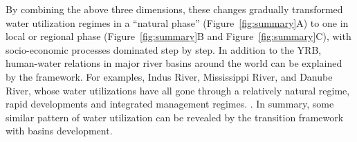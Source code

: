 \documentclass[9pt, twocolumn, twoside, lineno]{pnas-new}
\begin{document}
By combining the above three dimensions, these changes gradually transformed water utilization regimes in a ``natural phase'' (Figure~\ref{fig:summary}A) to one in local or regional phase (Figure~\ref{fig:summary}B and Figure~\ref{fig:summary}C), with socio-economic processes dominated step by step. In addition to the YRB, human-water relations in major river basins around the world can be explained by the framework. 
For examples, Indus River, Mississippi River, and Danube River, whose water utilizations have all gone through a relatively natural regime, rapid developments and integrated management regimes. 
\cite{bestAnthropogenicStressesWorld2019,cummingResilienceBigRiver2011}. 
In summary, some similar pattern of water utilization can be revealed by the transition framework with basins development.
\end{document}
